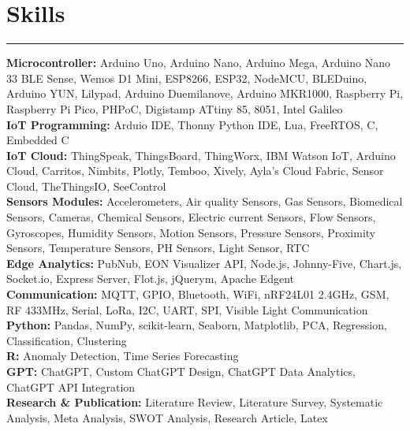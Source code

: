 \documentclass[10pt, a4paper]{article}
\begin{document}
		\section*{Skills}
		\vspace*{-2.5mm}
		\hrule 
		\vspace*{2mm}
		\textbf{Microcontroller:} Arduino Uno, Arduino Nano, Arduino Mega, Arduino Nano 33 BLE Sense, Wemos D1 Mini, ESP8266, ESP32, NodeMCU, BLEDuino, Arduino YUN, Lilypad, Arduino Duemilanove, Arduino MKR1000, Raspberry Pi, Raspberry Pi Pico, PHPoC, Digistamp ATtiny 85, 8051, Intel Galileo 
		\\
		\textbf{IoT Programming:} Arduio IDE, Thonny Python IDE, Lua, FreeRTOS, C, Embedded C
		\\	
		\textbf{IoT Cloud:} ThingSpeak, ThingsBoard, ThingWorx, IBM Watson IoT, Arduino Cloud, Carritos, Nimbits, Plotly, Temboo, Xively, Ayla's Cloud Fabric, Sensor Cloud, TheThingsIO, SeeControl
		\\
		\textbf{Sensors Modules:} Accelerometers, Air quality Sensors, Gas Sensors, Biomedical Sensors, Cameras, Chemical Sensors, Electric current Sensors, Flow Sensors, Gyroscopes, Humidity Sensors, Motion Sensors, Pressure Sensors, Proximity Sensors, Temperature Sensors, PH Sensors, Light Sensor, RTC
		\\	
		\textbf{Edge Analytics:} PubNub, EON Visualizer API, Node.js, Johnny-Five, Chart.js, Socket.io, Express Server, Flot.js, jQuerym, Apache Edgent
		\\	    
		\textbf{Communication:} MQTT, GPIO, Bluetooth, WiFi, nRF24L01 2.4GHz, GSM, RF 433MHz, Serial, LoRa, I2C, UART, SPI, Visible Light Communication 
		\\
		\textbf{Python:} Pandas, NumPy, scikit-learn, Seaborn, Matplotlib, PCA, Regression, Classification, Clustering
		\\
		\textbf{R:} Anomaly Detection, Time Series Forecasting
		\\	    	
		\textbf{GPT:} ChatGPT, Custom ChatGPT Design, ChatGPT Data Analytics, ChatGPT API Integration
		\\
		\textbf{Research \& Publication:} Literature Review, Literature Survey, Systematic Analysis, Meta Analysis, SWOT Analysis, Research Article, Latex 

		\vspace*{-3mm}
		
	
\end{document}
